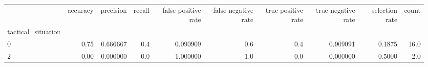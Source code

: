 \begin{tabular}{lrrrrrrrrr}
\toprule
{} &  accuracy &  precision &  recall &  false positive rate &  false negative rate &  true positive rate &  true negative rate &  selection rate &  count \\
tactical\_situation &           &            &         &                      &                      &                     &                     &                 &        \\
\midrule
0                  &      0.75 &   0.666667 &     0.4 &             0.090909 &                  0.6 &                 0.4 &            0.909091 &          0.1875 &   16.0 \\
2                  &      0.00 &   0.000000 &     0.0 &             1.000000 &                  1.0 &                 0.0 &            0.000000 &          0.5000 &    2.0 \\
\bottomrule
\end{tabular}
